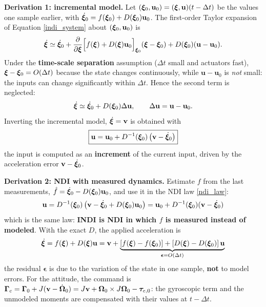\documentclass[10pt, a4paper]{report}
\begin{document}
\noindent\textbf{Derivation 1: incremental model.} Let $({\boldsymbol{\xi}}_0,\mathbf u_0)=({\boldsymbol{\xi}},\mathbf u)(t-\Delta t)$ be the values one sample earlier, with $\dot{{\boldsymbol{\xi}}}_0=f({\boldsymbol{\xi}}_0)+D({\boldsymbol{\xi}}_0)\mathbf u_0$. The first-order Taylor expansion of Equation \eqref{indi_system} about $({\boldsymbol{\xi}}_0,\mathbf u_0)$ is
\begin{equation}
    \dot{{\boldsymbol{\xi}}}\simeq\dot{{\boldsymbol{\xi}}}_0+\frac{\partial}{\partial{\boldsymbol{\xi}}}\Big[f({\boldsymbol{\xi}})+D({\boldsymbol{\xi}})\mathbf u_0\Big]_{{\boldsymbol{\xi}}_0}({\boldsymbol{\xi}}-{\boldsymbol{\xi}}_0)+D({\boldsymbol{\xi}}_0)(\mathbf u-\mathbf u_0).
\end{equation}
Under the \textbf{time-scale separation} assumption ($\Delta t$ small and actuators fast), ${\boldsymbol{\xi}}-{\boldsymbol{\xi}}_0=O(\Delta t)$ because the state changes continuously, while $\mathbf u-\mathbf u_0$ is \textit{not} small: the inputs can change significantly within $\Delta t$. Hence the second term is neglected:\begin{equation}
    \dot{{\boldsymbol{\xi}}}\simeq\dot{{\boldsymbol{\xi}}}_0+D({\boldsymbol{\xi}}_0)\Delta\mathbf u,\qquad\Delta\mathbf u=\mathbf u-\mathbf u_0.
\end{equation}
Inverting the incremental model, $\dot{{\boldsymbol{\xi}}}=\mathbf v$ is obtained with
\begin{equation}\label{indi_law}
    \boxed{\mathbf u=\mathbf u_0+D^{-1}({\boldsymbol{\xi}}_0)\left(\mathbf v-\dot{{\boldsymbol{\xi}}}_0\right)}
\end{equation}
the input is computed as an \textbf{increment} of the current input, driven by the acceleration error $\mathbf v-\dot{{\boldsymbol{\xi}}}_0$.\bigskip

\noindent\textbf{Derivation 2: NDI with measured dynamics.} Estimate $f$ from the last measurements, $\hat f=\dot{{\boldsymbol{\xi}}}_0-D({\boldsymbol{\xi}}_0)\mathbf u_0$, and use it in the NDI law \eqref{ndi_law}:\begin{equation}
    \mathbf u=D^{-1}({\boldsymbol{\xi}}_0)\left(\mathbf v-\dot{{\boldsymbol{\xi}}}_0+D({\boldsymbol{\xi}}_0)\mathbf u_0\right)=\mathbf u_0+D^{-1}({\boldsymbol{\xi}}_0)(\mathbf v-\dot{{\boldsymbol{\xi}}}_0)
\end{equation}
which is the same law: \textbf{INDI is NDI in which $f$ is measured instead of modeled}. With the exact $D$, the applied acceleration is
\begin{equation}
    \dot{{\boldsymbol{\xi}}}=f({\boldsymbol{\xi}})+D({\boldsymbol{\xi}})\mathbf u=\mathbf v+\underbrace{\left[f({\boldsymbol{\xi}})-f({\boldsymbol{\xi}}_0)\right]+\left[D({\boldsymbol{\xi}})-D({\boldsymbol{\xi}}_0)\right]\mathbf u}_{\boldsymbol{\epsilon}=O(\Delta t)}
\end{equation}
the residual $\boldsymbol{\epsilon}$ is due to the variation of the state in one sample, \textbf{not} to model errors. For the attitude, the command is $\boldsymbol{\Gamma}_c=\boldsymbol{\Gamma}_0+J(\mathbf v-\dot{{\boldsymbol{\Omega}}}_0)=J\mathbf v+{\boldsymbol{\Omega}}_0\times J{\boldsymbol{\Omega}}_0-{\boldsymbol{\tau}}_{e,0}$: the gyroscopic term and the unmodeled moments are compensated with their values at $t-\Delta t$.
\end{document}

